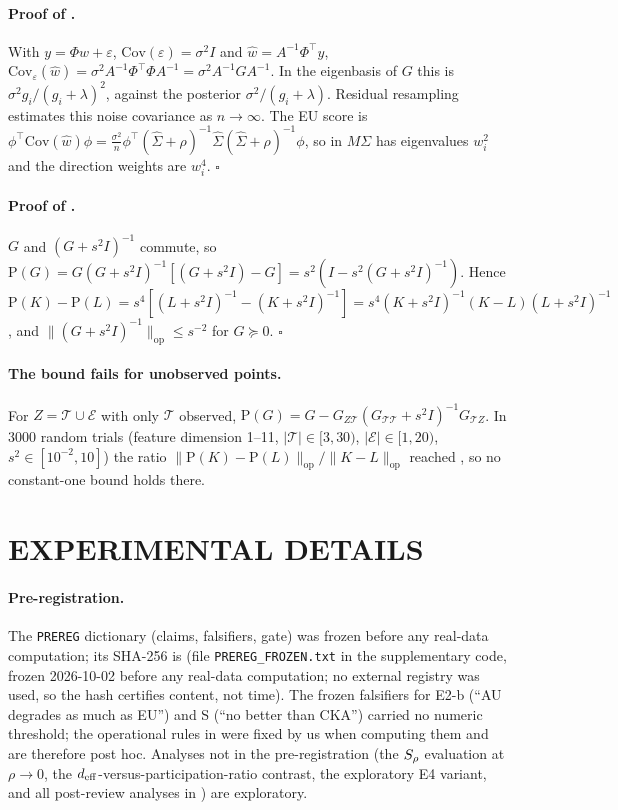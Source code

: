 \paragraph{Proof of .}
With $y=\Phi w+\varepsilon$, $\mathrm{Cov}(\varepsilon)=\sigma^2I$ and $\hat w=A^{-1}\Phi^\top y$, $\mathrm{Cov}_\varepsilon(\hat w)=\sigma^2A^{-1}\Phi^\top\Phi A^{-1}=\sigma^2A^{-1}GA^{-1}$. In the eigenbasis of $G$ this is $\sigma^2g_i/(g_i+\lambda)^2$, against the posterior $\sigma^2/(g_i+\lambda)$. Residual resampling estimates this noise covariance as $n\to\infty$. The EU score is $\phi^\top\mathrm{Cov}(\hat w)\phi=\frac{\sigma^2}{n}\phi^\top(\hat\Sigma+\rho)^{-1}\hat\Sigma(\hat\Sigma+\rho)^{-1}\phi$, so in  $M\Sigma$ has eigenvalues $w_i^2$ and the direction weights are $w_i^4$. \hfill$\square$

\paragraph{Proof of .}
$G$ and $(G+s^2I)^{-1}$ commute, so $\mathrm P(G)=G(G+s^2I)^{-1}[(G+s^2I)-G]=s^2(I-s^2(G+s^2I)^{-1})$. Hence $\mathrm P(K)-\mathrm P(L)=s^4[(L+s^2I)^{-1}-(K+s^2I)^{-1}]=s^4(K+s^2I)^{-1}(K-L)(L+s^2I)^{-1}$, and $\|(G+s^2I)^{-1}\|_{\mathrm{op}}\le s^{-2}$ for $G\succeq0$. \hfill$\square$

\paragraph{The bound fails for unobserved points.}
For $Z=\mathcal T\cup\mathcal E$ with only $\mathcal T$ observed, $\mathrm P(G)=G-G_{Z\mathcal T}(G_{\mathcal T\mathcal T}+s^2I)^{-1}G_{\mathcal TZ}$. In 3000 random trials (feature dimension 1--11, $|\mathcal T|\in[3,30)$, $|\mathcal E|\in[1,20)$, $s^2\in[10^{-2},10]$) the ratio $\|\mathrm P(K)-\mathrm P(L)\|_{\mathrm{op}}/\|K-L\|_{\mathrm{op}}$ reached \ResolventWorst{}, so no constant-one bound holds there.

\section{EXPERIMENTAL DETAILS}
\label{app:details}

\paragraph{Pre-registration.} The \texttt{PREREG} dictionary (claims, falsifiers, gate) was frozen before any real-data computation; its SHA-256 is \texttt{\PreregHashFull} (file \texttt{PREREG\_FROZEN.txt} in the supplementary code, frozen 2026-10-02 before any real-data computation; no external registry was used, so the hash certifies content, not time). The frozen falsifiers for E2-b (``AU degrades as much as EU'') and S (``no better than CKA'') carried no numeric threshold; the operational rules in  were fixed by us when computing them and are therefore post hoc. Analyses not in the pre-registration (the $S_{\rho}$ evaluation at $\rho\to0$, the $d_{\mathrm{eff}}$-versus-participation-ratio contrast, the exploratory E4 variant, and all post-review analyses in ) are exploratory.

